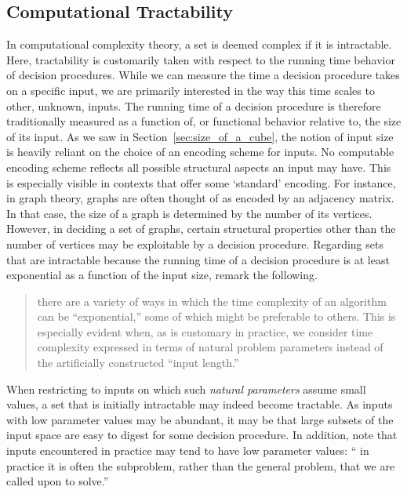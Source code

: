 \subsection{Computational Tractability}
In computational complexity theory, a set is deemed complex if it is intractable.
Here, tractability is customarily taken with respect to the running time behavior of decision procedures.
While we can measure the time a decision procedure takes on a specific input, we are primarily interested in the way this time scales to other, unknown, inputs.
The running time of a decision procedure is therefore traditionally measured as a function of, or functional behavior relative to, the size of its input.
As we saw in Section~\ref{sec:size_of_a_cube}, the notion of input size is heavily reliant on the choice of an encoding scheme for inputs.
No computable encoding scheme reflects all possible structural aspects an input may have.
This is especially visible in contexts that offer some `standard' encoding.
For instance, in graph theory, graphs are often thought of as encoded by an adjacency matrix.
In that case, the size of a graph is determined by the number of its vertices.
However, in deciding a set of graphs, certain structural properties other than the number of vertices may be exploitable by a decision procedure.
Regarding sets that are intractable because the running time of a decision procedure is at least exponential as a function of the input size, \citeauthor{garey1979computers} remark the following.
\blockcquote{garey1979computers}{
  \textelp{} there are a variety of ways in which the time complexity of an algorithm can be \enquote{exponential,} some of which might be preferable to others.
  This is especially evident when, as is customary in practice, we consider time complexity expressed in terms of natural problem parameters instead of the artificially constructed \enquote{input length.}
}
When restricting to inputs on which such \emph{natural parameters} assume small values, a set that is initially intractable may indeed become tractable.
As inputs with low parameter values may be abundant, it may be that large subsets of the input space are easy to digest for some decision procedure.
In addition, \citeauthor{garey1979computers} note that inputs encountered in practice may tend to have low parameter values:
\enquote{\textelp{} in practice it is often the subproblem, rather than the general problem, that we are called upon to solve.}

